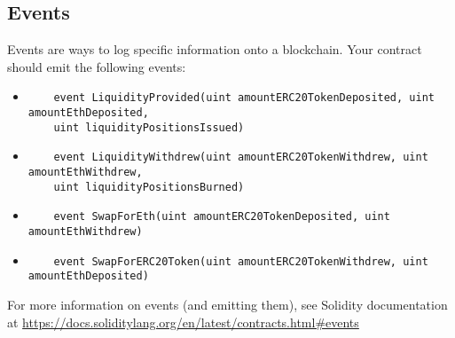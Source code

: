 \documentclass[10pt]{article}
\begin{document}
\subsection{Events}
Events are ways to log specific information onto a blockchain.  Your contract should emit the following events:
\begin {itemize}
\item
\begin{verbatim}
    event LiquidityProvided(uint amountERC20TokenDeposited, uint amountEthDeposited, 
    uint liquidityPositionsIssued)
\end{verbatim}
 \item
\begin{verbatim}
    event LiquidityWithdrew(uint amountERC20TokenWithdrew, uint amountEthWithdrew, 
    uint liquidityPositionsBurned)
\end{verbatim}
 \item
\begin{verbatim}
    event SwapForEth(uint amountERC20TokenDeposited, uint amountEthWithdrew)
\end{verbatim}
 \item
\begin{verbatim}
    event SwapForERC20Token(uint amountERC20TokenWithdrew, uint amountEthDeposited)
\end{verbatim}
\end{itemize}

For more information on events (and emitting them), see Solidity documentation at \url{https://docs.soliditylang.org/en/latest/contracts.html#events}
\end{document}
